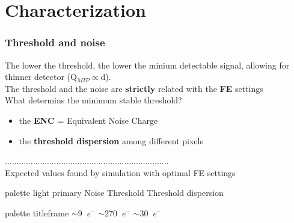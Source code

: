 \section{Characterization}
    \begin{frame}
        \frametitle{Threshold and noise}\medskip
        The lower the threshold, the lower the minium detectable signal, allowing for thinner detector (Q$_{MIP}\propto$d). \\
        \medskip
        The threshold and the noise are \textbf{strictly} related with the \textbf{FE} settings\\
        \medskip
        What determins the minimum stable threshold?
        \begin{itemize}
            \item the \textbf{ENC} = Equivalent Noise Charge
            \item the \textbf{threshold dispersion} among different pixels
        \end{itemize}
        \medskip
        \centering ......................................................................\\\medskip
        \centering Expected values found by simulation with optimal FE settings %
        \begin{center}
        \begin{beamercolorbox}[rounded=true, center]{palette light primary}
            Noise \hspace*{1.2cm} Threshold \hspace*{1.2cm} Threshold dispersion
        \end{beamercolorbox}
        \begin{beamercolorbox}[rounded=true, center]{palette titleframe}
            \hspace*{-2.4cm} $\sim$\SI{9}{\elementarycharge}$^-$ \hspace*{1.4cm} $\sim$\SI{270}{\elementarycharge}$^-$ \hspace*{1.2cm} $\sim$\SI{30}{\elementarycharge}$^-$
        \end{beamercolorbox}
    \end{center}
    \end{frame}


